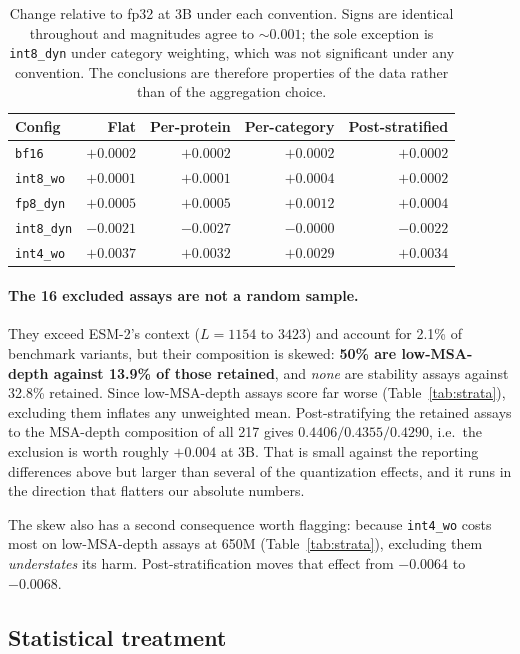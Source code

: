 \documentclass[11pt]{article}
\newcommand{\cfg}[1]{\texttt{#1}}
\begin{document}
\begin{table}[htb]
\centering
\caption{Change relative to fp32 at 3B under each convention. Signs are
identical throughout and magnitudes agree to $\sim$$0.001$; the sole exception
is \cfg{int8\_dyn} under category weighting, which was not significant under any
convention. The conclusions are therefore properties of the data rather than of
the aggregation choice.}
\label{tab:agg2}
\small
\begin{tabular}{lrrrr}
\toprule
Config & Flat & Per-protein & Per-category & Post-stratified \\
\midrule
\cfg{bf16}      & $+0.0002$ & $+0.0002$ & $+0.0002$ & $+0.0002$ \\
\cfg{int8\_wo}  & $+0.0001$ & $+0.0001$ & $+0.0004$ & $+0.0002$ \\
\cfg{fp8\_dyn}  & $+0.0005$ & $+0.0005$ & $+0.0012$ & $+0.0004$ \\
\cfg{int8\_dyn} & $-0.0021$ & $-0.0027$ & $-0.0000$ & $-0.0022$ \\
\cfg{int4\_wo}  & $+0.0037$ & $+0.0032$ & $+0.0029$ & $+0.0034$ \\
\bottomrule
\end{tabular}
\end{table}

\paragraph{The 16 excluded assays are not a random sample.} They exceed ESM-2's
context ($L = 1154$ to $3423$) and account for 2.1\% of benchmark variants, but
their composition is skewed: \textbf{50\% are low-MSA-depth against 13.9\% of
those retained}, and \emph{none} are stability assays against 32.8\% retained.
Since low-MSA-depth assays score far worse (Table~\ref{tab:strata}), excluding
them inflates any unweighted mean. Post-stratifying the retained assays to the
MSA-depth composition of all 217 gives $0.4406 / 0.4355 / 0.4290$, i.e.\ the
exclusion is worth roughly $+0.004$ at 3B. That is small against the reporting
differences above but larger than several of the quantization effects, and it
runs in the direction that flatters our absolute numbers.

The skew also has a second consequence worth flagging: because \cfg{int4\_wo}
costs most on low-MSA-depth assays at 650M (Table~\ref{tab:strata}), excluding
them \emph{understates} its harm. Post-stratification moves that effect from
$-0.0064$ to $-0.0068$.

\subsection{Statistical treatment}
\end{document}
